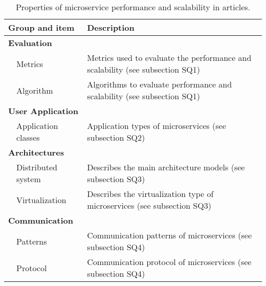 \begin{table*}[!bt]
\centering
\renewcommand{\arraystretch}{1.5}
\caption{Properties of microservice performance and scalability in articles.}
\label{table_CG1}
\begin{tabular}{ll@{\hspace{8em}}l}
\hline
\multicolumn{2}{l}{Group and item} & Description \\ \hline

\multicolumn{2}{l}{\textbf{Evaluation}} &  \\
 & Metrics & Metrics used to evaluate the performance and scalability (see subsection SQ1) \\
 & Algorithm & Algorithms to evaluate performance and scalability (see subsection SQ1) \\
 
\multicolumn{2}{l}{\textbf{User Application}} &  \\
 & Application classes & Application types of microservices (see subsection SQ2) \\
 
\multicolumn{2}{l}{\textbf{Architectures}} &  \\
 & Distributed system & Describes the main architecture models (see subsection SQ3) \\
 & Virtualization & Describes the virtualization type of microservices (see subsection SQ3) \\
 
\multicolumn{2}{l}{\textbf{Communication}} &  \\
 & Patterns & Communication patterns of microservices (see subsection SQ4) \\
 & Protocol & Communication protocol of microservices (see subsection SQ4) \\ \hline
\end{tabular}
\end{table*}